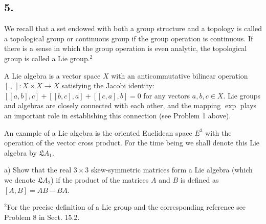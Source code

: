 \subsection*{5.}
We recall that a set endowed with both a group structure and a topology is called a topological group or continuous group if the group operation is continuous. If there is a sense in which the group operation is even analytic, the topological group is called a Lie group.$^2$

A Lie algebra is a vector space $X$ with an anticommutative bilinear operation $[\, , \,]: X \times X \rightarrow X$ satisfying the Jacobi identity: $[[a, b], c] + [[b, c], a] + [[c, a], b] = 0$ for any vectors $a, b, c \in X$. Lie groups and algebras are closely connected with each other, and the mapping $\exp$ plays an important role in establishing this connection (see Problem 1 above).

An example of a Lie algebra is the oriented Euclidean space $E^3$ with the operation of the vector cross product. For the time being we shall denote this Lie algebra by $\mathfrak{L}A_1.$

a) Show that the real $3 \times 3$ skew-symmetric matrices form a Lie algebra (which we denote $\mathfrak{L}A_2$) if the product of the matrices $A$ and $B$ is defined as $[A, B] = AB - BA.$

$^2$For the precise definition of a Lie group and the corresponding reference see Problem 8 in Sect. 15.2.
